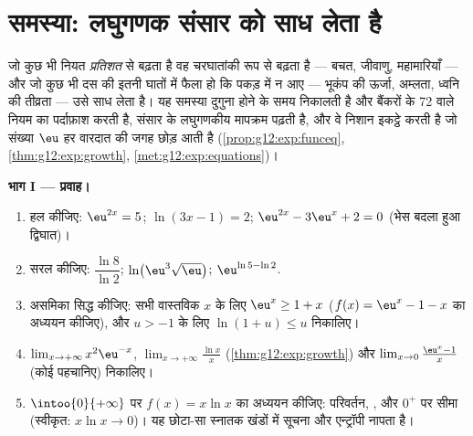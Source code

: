 \section{समस्या: लघुगणक संसार को साध लेता है}

\begin{problem}
\label{pb:g12:exp:1}
जो कुछ भी नियत \emph{प्रतिशत} से बढ़ता है वह चरघातांकी रूप से बढ़ता है ---
बचत, जीवाणु, महामारियाँ --- और जो कुछ भी दस की इतनी घातों में फैला हो कि पकड़
में न आए --- भूकंप की ऊर्जा, अम्लता, ध्वनि की तीव्रता --- उसे  साध लेता
है। यह समस्या दुगुना होने के समय निकालती है और बैंकरों के 72 वाले नियम का
पर्दाफ़ाश करती है, संसार के लघुगणकीय मापक्रम पढ़ती है, और वे निशान इकट्ठे करती
है जो संख्या $\eu$ हर वारदात की जगह छोड़ आती है (\cref{prop:g12:exp:funceq}, \cref{thm:g12:exp:growth}, \cref{met:g12:exp:equations})।

\medskip
\noindent\textbf{भाग I --- प्रवाह।}
\begin{enumerate}
  \item हल कीजिए: $\eu^{2x} = 5$; \quad $\ln(3x - 1) = 2$; \quad $\eu^{2x} - 3\eu^x + 2 = 0$ (भेस बदला हुआ द्विघात)।
  \item सरल कीजिए: $\dfrac{\ln 8}{\ln 2}$; \quad $\ln\!\left(\eu^3 \sqrt{\eu}\right)$; \quad $\eu^{\ln 5 - \ln 2}$.
  \item {} असमिका सिद्ध कीजिए: सभी वास्तविक $x$ के लिए $\eu^x \geq 1 + x$ ($f(x) = \eu^x - 1 - x$ का
        अध्ययन कीजिए), और $u > -1$ के लिए $\ln(1 + u) \leq u$ निकालिए।
  \item $\lim_{x \to +\infty} x^2 \eu^{-x}$, $\lim_{x \to +\infty} \frac{\ln x}{x}$ (\cref{thm:g12:exp:growth}) और $\lim_{x \to 0} \frac{\eu^x - 1}{x}$ (कोई  पहचानिए) निकालिए।
  \item $\intoo{0}{+\infty}$ पर $f(x) = x \ln x$ का अध्ययन कीजिए: परिवर्तन, , और $0^+$ पर सीमा
        (स्वीकृत: $x \ln x \to 0$)। यह छोटा-सा  स्नातक खंडों में सूचना और
        एन्ट्रॉपी नापता है।
\end{enumerate}


\end{problem}
